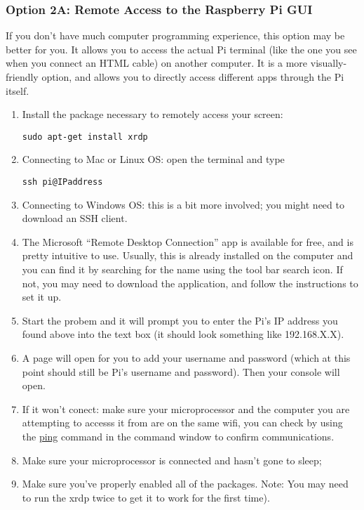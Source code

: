 \documentclass{article}\usepackage[]{graphicx}\usepackage[]{color}
\begin{document}
\subsubsection{Option 2A: Remote Access to the Raspberry Pi GUI}

If you don't have much computer programming experience, this option may be better for you.  It allows you to access the actual Pi terminal (like the one you see when you connect an HTML cable) on another computer.  It is a more visually-friendly option, and allows you to directly access different apps through the Pi itself.

\begin{enumerate}

\item Install the package necessary to remotely access your screen: 

\begin{lstlisting}
sudo apt-get install xrdp
\end{lstlisting}

\item Connecting to Mac or Linux OS: open the terminal and type

\begin{lstlisting}
ssh pi@IPaddress
\end{lstlisting}

\item Connecting to Windows OS: this is a bit more involved; you might need to download an SSH client. 

\item The Microsoft ``Remote Desktop Connection'' app is available for free, and is pretty intuitive to use. Usually, this is already installed on the computer and you can find it by searching for the name using the tool bar search icon. If not, you may need to download the application, and follow the instructions to set it up. 

\item Start the probem and it will prompt you to enter the Pi's IP  address you found above into the text box (it should look something like 192.168.X.X).

\item A page will open for you to add your username and password (which at this point should still be Pi's username and password).  Then your console will open.

\item If it won't conect: make sure your microprocessor and the computer you are attempting to accesss it from are on the same wifi, you can check by using the \hyperlink{ping}{ping} command in the command window to confirm communications.

\item Make sure your microprocessor is connected and hasn't gone to sleep;

\item Make sure you've properly enabled all of the packages. Note: You may need to run the  xrdp twice to get it to work for the first time).  

\end{enumerate}
\end{document}
